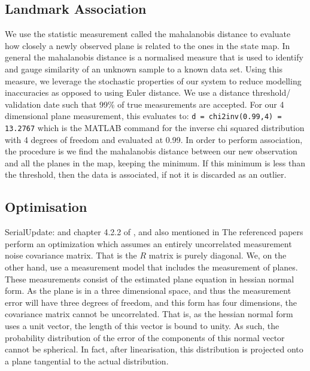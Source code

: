 \documentclass[]{article}
\begin{document}
{%

\subsection{Landmark Association} %
\label{sub:landmark_association}
We use the statistic measurement called the mahalanobis distance to evaluate how closely a newly observed plane is related to the ones in the state map. In general the mahalanobis distance is a normalised measure that is used to identify and gauge similarity of an unknown sample to a known data set. Using this measure, we leverage the stochastic properties of our system to reduce modelling inaccuracies as opposed to using Euler distance. We use a distance threshold/ validation date such that 99\% of true measurements are accepted. For our 4 dimensional plane measurement, this evaluates to:
\verb"d = chi2inv(0.99,4) = 13.2767" which is the MATLAB command for the inverse chi squared distribution with 4 degrees of freedom and evaluated at 0.99. In order to perform association, the procedure is we find the mahalanobis distance between our new observation and all the planes in the map, keeping the minimum. If this minimum is less than the threshold, then the data is associated, if not it is discarded as an outlier.

\subsection{Optimisation} %
\label{sub:optimisation}

SerialUpdate: \cite{OpenPilotPaper} and chapter 4.2.2 of \cite{KFBookSerialupdate}, and also mentioned in \cite{Sola2013}
The referenced papers perform an optimization which assumes an entirely uncorrelated measurement noise covariance matrix. That is the $R$ matrix is purely diagonal.
We, on the other hand, use a measurement model that includes the measurement of planes. These measurements consist of the estimated plane equation in hessian normal form. As the plane is in a three dimensional space, and thus the measurement error will have three degrees of freedom, and this form has four dimensions, the covariance matrix cannot be uncorrelated.
That is, as the hessian normal form uses a unit vector, the length of this vector is bound to unity. As such, the probability distribution of the error of the components of this normal vector cannot be spherical.
In fact, after linearisation, this distribution is projected onto a plane tangential to the actual distribution. 

}
\end{document}
